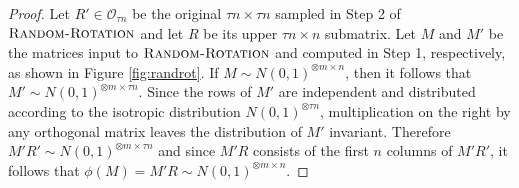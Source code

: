 \begin{proof}
Let $R' \in \mathcal{O}_{\tau n}$ be the original $\tau n \times \tau n$ sampled in Step 2 of $\textsc{Random-Rotation}$ and let $R$ be its upper $\tau n \times n$ submatrix. Let $M$ and $M'$ be the matrices input to $\textsc{Random-Rotation}$ and computed in Step 1, respectively, as shown in Figure \ref{fig:randrot}. If $M \sim N(0, 1)^{\otimes m \times n}$, then it follows that $M' \sim N(0, 1)^{\otimes m \times \tau n}$. Since the rows of $M'$ are independent and distributed according to the isotropic distribution $N(0, 1)^{\otimes \tau n}$, multiplication on the right by any orthogonal matrix leaves the distribution of $M'$ invariant. Therefore $M' R' \sim N(0, 1)^{\otimes m \times \tau n}$ and since $M' R$ consists of the first $n$ columns of $M'R'$, it follows that $\phi(M) = M'R \sim N(0, 1)^{\otimes m \times n}$.


\end{proof}
